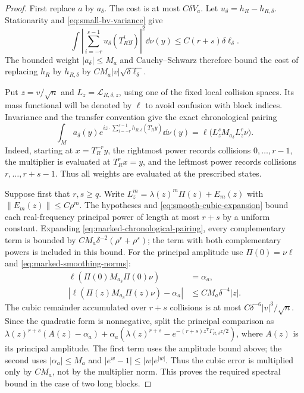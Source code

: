 \begin{proof}
First replace $a$ by $a_\delta$. The cost is at most $C\delta V_a$.
Let $u_\delta=h_R-h_{R,\delta}$. Stationarity and
\eqref{eq:small-bv-variance} give
\[
 \int\left|\sum_{i=-r}^{s-1}u_\delta(T_R^iy)\right|^2\dd\nu(y)
       \le C(r+s)\delta\ell_\delta.
\]
The bounded weight $|a_\delta|\le M_a$ and Cauchy--Schwarz therefore
bound the cost of replacing $h_R$ by $h_{R,\delta}$ by
$C M_a|v|\sqrt{\delta\ell_\delta}$.

Put $z=v/\sqrt n$ and $L_z=\mathcal L_{R,\delta,z}$, using one of
the fixed local collision spaces. Its mass functional will be denoted
by $\ell$ to avoid confusion with block indices. Invariance and the
transfer convention give the exact chronological pairing
\begin{equation}\label{eq:marked-chronological-pairing}
 \int_M a_\delta(y)
 e^{iz\cdot\sum_{i=-r}^{s-1}h_{R,\delta}(T_R^iy)}\dd\nu(y)
       =\ell\bigl(L_z^s M_{a_\delta} L_z^r\nu\bigr).
\end{equation}
Indeed, starting at $x=T_R^{-r}y$, the rightmost power records collisions
$0,\ldots,r-1$, the multiplier is evaluated at $T_R^rx=y$, and the
leftmost power records collisions $r,\ldots,r+s-1$. Thus all weights
are evaluated at the prescribed states.

Suppose first that $r,s\ge q$. Write
$L_z^m=\lambda(z)^m\Pi(z)+E_m(z)$ with
$\|E_m(z)\|\le C\rho^m$. The hypotheses and
\eqref{eq:smooth-cubic-expansion} bound each real-frequency principal
power of length at most $r+s$ by a uniform constant. Expanding
\eqref{eq:marked-chronological-pairing}, every complementary term is
bounded by $C M_a\delta^{-2}(\rho^r+\rho^s)$; the term with both
complementary powers is included in this bound. For the principal
amplitude use $\Pi(0)=\nu\ell$ and \eqref{eq:marked-smoothing-norms}:
\begin{align*}
 \ell(\Pi(0)M_{a_\delta}\Pi(0)\nu)&=\alpha_a,\\
 |\ell(\Pi(z)M_{a_\delta}\Pi(z)\nu)-\alpha_a|
       &\le C M_a\delta^{-4}|z|.
\end{align*}
The cubic remainder accumulated over $r+s$ collisions is at most
$C\delta^{-6}|v|^3/\sqrt n$. Since the quadratic form is nonnegative,
split the principal comparison as
$\lambda(z)^{r+s}(A(z)-\alpha_a)
 +\alpha_a(\lambda(z)^{r+s}-e^{-(r+s)z^{\mathsf T}\Gamma_{R,\delta}z/2})$,
where $A(z)$ is its principal amplitude. The first term uses the
amplitude bound above; the second uses $|\alpha_a|\le M_a$ and
$|e^w-1|\le |w|e^{|w|}$. Thus the cubic error is multiplied only
by $C M_a$, not by the multiplier norm. This proves the required spectral bound in the
case of two long blocks.


\end{proof}
